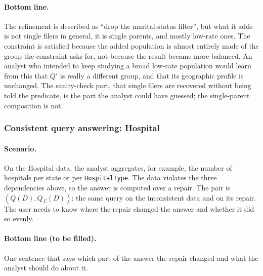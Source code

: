 \paragraph{Bottom line.}
The refinement is described as ``drop the marital-status filter'', but what it adds is not single filers in general, it is single parents, and mostly low-rate ones. The constraint is satisfied because the added population is almost entirely made of the group the constraint asks for, not because the result became more balanced. An analyst who intended to keep studying a broad low-rate population would learn from this that $Q'$ is really a different group, and that its geographic profile is unchanged. The sanity-check part, that single filers are recovered without being told the predicate, is the part the analyst could have guessed; the single-parent composition is not.

\subsubsection{Consistent query answering: Hospital}
\label{subsec:case-cqa}

\paragraph{Scenario.}
On the Hospital data, the analyst aggregates, for example, the number of hospitals per state or per \texttt{HospitalType}. The data violates the three dependencies above, so the answer is computed over a repair. The pair is $(Q(D),Q_\Sigma(D))$: the same query on the inconsistent data and on its repair.
The user needs to know where the repair changed the answer and whether it did so evenly.

\paragraph{Bottom line (to be filled).}
One sentence that says which part of the answer the repair changed and what the analyst should do about it.

